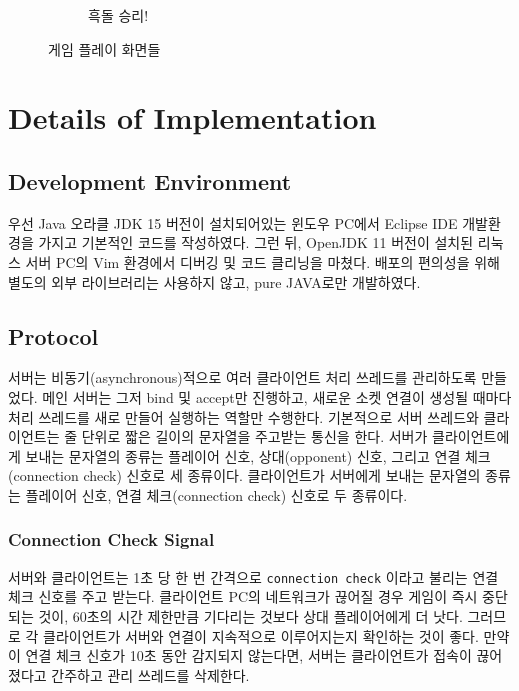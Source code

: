 \documentclass[a4paper, 10pt]{article}
\begin{document}
\begin{figure}[h]
\begin{subfigure}{.3\textwidth}
    \caption{흑돌 승리!}
    \label{fig:room}
  \end{subfigure}
  \caption{게임 플레이 화면들}
\end{figure}

\section{Details of Implementation}
\subsection{Development Environment}
우선 Java 오라클 JDK 15 버전이 설치되어있는 윈도우 PC에서 Eclipse IDE
개발환경을 가지고 기본적인 코드를 작성하였다. 그런 뒤, OpenJDK 11 버전이
설치된 리눅스 서버 PC의 Vim 환경에서 디버깅 및 코드 클리닝을 마쳤다.
배포의 편의성을 위해 별도의 외부 라이브러리는 사용하지 않고, pure JAVA로만
개발하였다.

\subsection{Protocol}
서버는 비동기(asynchronous)적으로 여러 클라이언트 처리 쓰레드를 관리하도록
만들었다. 메인 서버는 그저 bind 및 accept만 진행하고, 새로운 소켓 연결이
생성될 때마다 처리 쓰레드를 새로 만들어 실행하는 역할만 수행한다.
기본적으로 서버 쓰레드와 클라이언트는 줄 단위로 짧은 길이의 문자열을 주고받는
통신을 한다. 서버가 클라이언트에게 보내는 문자열의 종류는 플레이어 신호,
상대(opponent) 신호, 그리고 연결 체크(connection check) 신호로 세 종류이다.
클라이언트가 서버에게 보내는 문자열의 종류는 플레이어 신호, 연결 체크(connection
check) 신호로 두 종류이다.

\subsubsection{Connection Check Signal}
서버와 클라이언트는 1초 당 한 번 간격으로 \texttt{connection check}
이라고 불리는 연결 체크 신호를 주고 받는다. 클라이언트 PC의 네트워크가
끊어질 경우 게임이 즉시 중단되는 것이, 60초의 시간 제한만큼 기다리는 것보다
상대 플레이어에게 더 낫다. 그러므로 각 클라이언트가 서버와 연결이 지속적으로
이루어지는지 확인하는 것이 좋다. 만약 이 연결 체크 신호가 10초 동안 감지되지
않는다면, 서버는 클라이언트가 접속이 끊어졌다고 간주하고 관리 쓰레드를 삭제한다.
\end{document}
